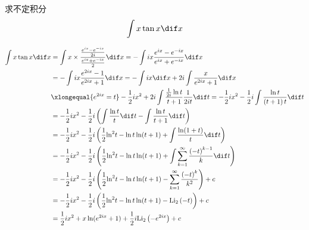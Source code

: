 \documentclass[color=green,titlestyle=hang]{elegantbook}%
\begin{document}
\newpage\begin{exercise}求不定积分\[\int {x\tan x} \dif x\]
\end{exercise}\begin{Solution}\begin{align*}
\int {x\tan x} \dif x &=\int {x \times \frac{{\frac{{{e^{ix}} - {e^{ - ix}}}}{{2i}}}}{{\frac{{{e^{ix}} + {e^{ - ix}}}}{2}}}} \dif x=  - \int {ix\frac{{{e^{ix}} - {e^{ - ix}}}}{{{e^{ix}} + {e^{ - ix}}}}} \dif x\\
&=  - \int {ix\frac{{{e^{2ix}} - 1}}{{{e^{2ix}} + 1}}} \dif x =  - \int {ix} \dif x + 2i\int {\frac{x}{{{e^{2ix}} + 1}}} \dif x\\
&\xlongequal{e^{2ix}= t}
- \frac{1}{2}i{x^2} + 2i\int {\frac{{\frac{1}{{2i}}\ln t}}{{t + 1}}} \frac{1}{{2it}}\dif t =  - \frac{1}{2}i{x^2} - \frac{1}{2}i\int {\frac{{\ln t}}{{\left( {t + 1} \right)t}}} \dif t\\
&=  - \frac{1}{2}i{x^2} - \frac{1}{2}i\left( {\int {\frac{{\ln t}}{t}} \dif t - \int {\frac{{\ln t}}{{t + 1}}} \dif t} \right)\\
&=  - \frac{1}{2}i{x^2} - \frac{1}{2}i\left( {\frac{1}{2}{{\ln }^2}t - \ln t\ln (t + 1) + \int {\frac{{\ln (1 + t)}}{t}} \dif t} \right)\\
&=  - \frac{1}{2}i{x^2} - \frac{1}{2}i\left( {\frac{1}{2}{{\ln }^2}t - \ln t\ln (t + 1) + \int {\sum\limits_{k = 1}^\infty  {\frac{{{{\left( { - t} \right)}^{k - 1}}}}{k}} } \dif t} \right)\\
& =  - \frac{1}{2}i{x^2} - \frac{1}{2}i\left( {\frac{1}{2}{{\ln }^2}t - \ln t\ln (t + 1) - \sum\limits_{k = 1}^\infty  {\frac{{{{( - t)}^k}}}{{{k^2}}}} } \right) + c\\
&  =  - \frac{1}{2}i{x^2} - \frac{1}{2}i\left( {\frac{1}{2}{{\ln }^2}t - \ln t\ln (t + 1) -\mathrm{Li}_2\left( { - t} \right)} \right) + c\\
&= \frac{1}{2}i{x^2} + x\ln ({e^{2ix}} + 1) + \frac{1}{2}i\mathrm{Li}_2\left( { - {e^{2ix}}} \right) + c
\end{align*}
\end{Solution}
\end{document}
